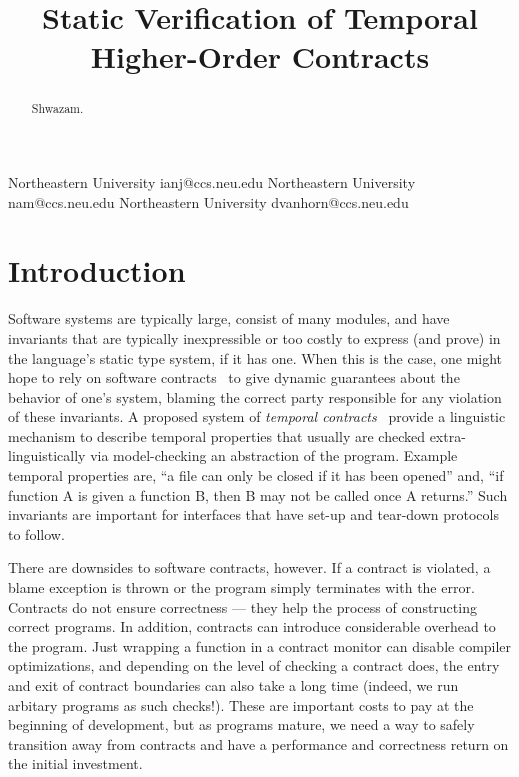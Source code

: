 \documentclass[preprint,onecolumn,9pt]{sigplanconf} %
\begin{document}
\copyrightdata{[to be supplied]}
\title{Static Verification of Temporal Higher-Order Contracts}

           {Northeastern University}
           {ianj@ccs.neu.edu}
           {Northeastern University}
           {nam@ccs.neu.edu}
           {Northeastern University}
           {dvanhorn@ccs.neu.edu}
\maketitle
\begin{abstract}
  Shwazam.
\end{abstract}

\section{Introduction}

Software systems are typically large, consist of many modules, and have invariants that are typically inexpressible or too costly to express (and prove) in the language's static type system, if it has one.
%
When this is the case, one might hope to rely on software contracts~\cite{p} to give dynamic guarantees about the behavior of one's system, blaming the correct party responsible for any violation of these invariants.
%
A proposed system of \emph{temporal contracts}~\citep{ianjohnson:dfm:icfp11} provide a linguistic mechanism to describe temporal properties that usually are checked extra-linguistically via model-checking an abstraction of the program.
%
Example temporal properties are, ``a file can only be closed if it has been opened'' and, ``if function A is given a function B, then B may not be called once A returns.''
%
Such invariants are important for interfaces that have set-up and tear-down protocols to follow.

There are downsides to software contracts, however.
%
If a contract is violated, a blame exception is thrown or the program simply terminates with the error.
%
Contracts do not ensure correctness --- they help the process of constructing correct programs.
%
In addition, contracts can introduce considerable overhead to the program.
%
Just wrapping a function in a contract monitor can disable compiler optimizations, and depending on the level of checking a contract does, the entry and exit of contract boundaries can also take a long time (indeed, we run arbitary programs as such checks!).
%
These are important costs to pay at the beginning of development, but as programs mature, we need a way to safely transition away from contracts and have a performance and correctness return on the initial investment.
\end{document}
